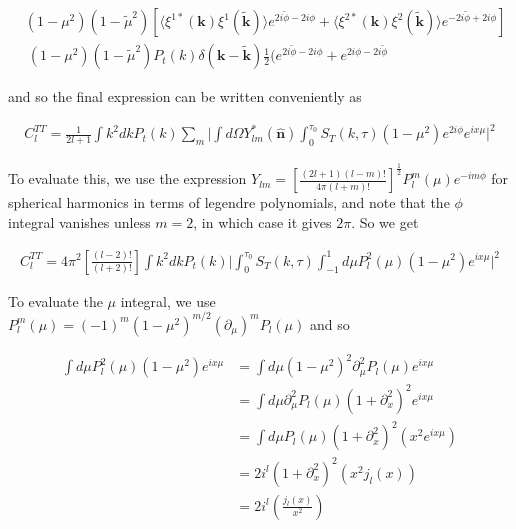 \documentclass[a4paper,10pt]{article}
\renewcommand{\v}[1]{\mathbf{#1}}
\newcommand{\half}{\frac{1}{2}}
\newcommand{\unit}[1]{\hat{\v{#1}}}
\newcommand{\ltwof}{[\frac{(l-2)!}{(l+2)!}]}
\begin{document}
\begin{equation}\begin{split}
&(1-\mu^2)(1-\tilde{\mu}^2)[\langle\xi^{1*}(\v{k})\xi^1(\v{\tilde{k}})\rangle e^{2i\tilde{\phi}-2i\phi}+\langle\xi^{2*}(\v{k})\xi^2(\v{\tilde{k}})\rangle e^{-2i\tilde{\phi}+2i\phi}]\\
&~ (1-\mu^2)(1-\tilde{\mu}^2)P_t(k)\delta(\v{k}-\v{\tilde{k}})\half(e^{2i\tilde{\phi}-2i\phi}+e^{2i\phi-2i\tilde{\phi}}
\end{split}\end{equation}

and so the final expression can be written conveniently as 

\begin{equation}\begin{split}
C_l^{TT} = \frac{1}{2l+1} \int k^2 dk P_t(k) \sum_m \bigg| \int d\Omega Y^*_{lm}(\unit{n}) \int_0^{\tau_0} S_T(k,\tau)(1-\mu^2)e^{2i\phi}e^{ix\mu} \bigg|^2
\end{split}\end{equation}

To evaluate this, we use the expression $Y_{lm} = [\frac{(2l+1)(l-m)!}{4\pi(l+m)!}]^\half P_l^m(\mu)e^{-im\phi}$ for spherical harmonics in terms of legendre polynomials, and note that the $\phi$ integral vanishes unless $m=2$, in which case it gives $2\pi$. So we get 

\begin{equation}\begin{split}
C_l^{TT} = 4\pi^2\ltwof \int k^2 dk P_t(k) \bigg|  \int_0^{\tau_0} S_T(k,\tau)\int_{-1}^1 d\mu P_l^2(\mu)(1-\mu^2)e^{ix\mu} \bigg|^2
\end{split}\end{equation}

To evaluate the $\mu$ integral, we use $P^m_l(\mu)=(-1)^m(1-\mu^2)^{m/2}(\partial_\mu)^mP_l(\mu)$ and so


\begin{equation}\begin{split}
\int d\mu P_l^2(\mu)(1-\mu^2)e^{ix\mu} 
&= \int d\mu(1-\mu^2)^2 \partial_\mu^2P_l(\mu)e^{ix\mu}\\
&= \int d\mu \partial_\mu^2P_l(\mu)(1+\partial_x^2)^2e^{ix\mu}\\
&= \int d\mu P_l(\mu)(1+\partial_x^2)^2(x^2e^{ix\mu})\\
&= 2i^l(1+\partial_x^2)^2(x^2j_l(x))\\
&= 2i^l(\frac{j_l(x)}{x^2})
\end{split}\end{equation}
\end{document}

